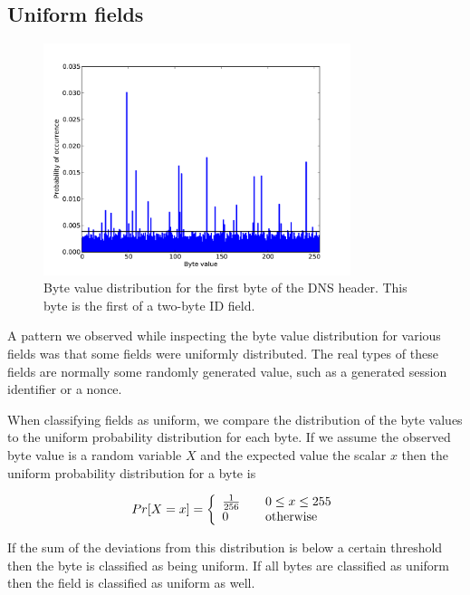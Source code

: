 \documentclass[a4paper]{report}
\begin{document}
\newpage

\subsection{Uniform fields}
\begin{figure}[h]
    \centering
    \includegraphics[width=0.8\textwidth]{uniform}
    \captionsetup{width=0.8\textwidth}
    \caption{Byte value distribution for the first byte of the DNS header.
        This byte is the first of a two-byte ID field.}
    \label{fig:uniform}
\end{figure}

A pattern we observed while inspecting the byte value distribution for
various fields was that some fields were uniformly distributed. The real
types of these fields are normally some randomly generated value, such as
a generated session identifier or a nonce.

When classifying fields as uniform, we compare the distribution of the byte
values to the uniform probability distribution for each byte. If we assume the
observed byte value is a random variable $X$ and the expected value the scalar
$x$ then the uniform probability distribution for a byte is

\[
    Pr[X = x] = \left\{
        \begin{array}{l l}
            \frac{1}{256} & \quad 0 \le x \le 255 \\
            0 & \quad \text{otherwise}
        \end{array}
    \right.
\]

If the sum of the deviations from this distribution is below a certain
threshold then the byte is classified as being uniform. If all bytes are
classified as uniform then the field is classified as uniform as well.
\end{document}
